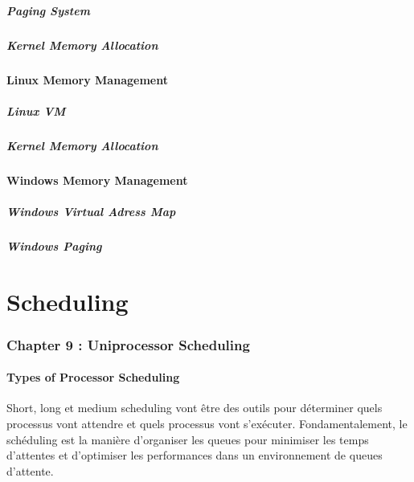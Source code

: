 \subsubsection{Paging System}
\subsubsection{Kernel Memory Allocation}
\subsection{Linux Memory Management}
\subsubsection{Linux VM}
\subsubsection{Kernel Memory Allocation}
\subsection{Windows Memory Management}
\subsubsection{Windows Virtual Adress Map }
\subsubsection{Windows Paging}


\newpage
\part{Scheduling}


\section{Chapter 9 : Uniprocessor Scheduling}

\subsection{Types of Processor Scheduling}
Short, long et medium scheduling vont être des outils pour déterminer quels processus vont attendre et quels processus vont s'exécuter.
Fondamentalement, le schéduling est la manière d'organiser les queues pour minimiser les temps d'attentes et d'optimiser les performances dans un environnement de queues d'attente.

